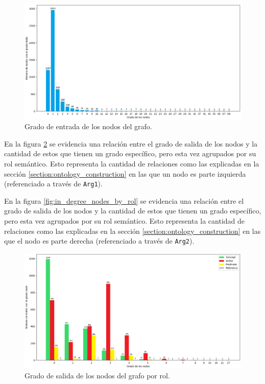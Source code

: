\vspace{-0.4in}
\begin{figure}[H]
	\begin{center}
		\includegraphics[width=\textwidth]{graphics/degree2.png}
		\caption[Grado de entrada de los nodos del grafo]{Grado de entrada de los nodos del grafo.}
		\label{fig:in_degree_all_nodes}
	\end{center}
\end{figure}

\vspace{-0.3in}
En la figura \ref{fig:out_degree_nodes_by_rol} se evidencia una relación entre el grado de salida de los nodos y la cantidad de estos que tienen un grado específico, pero esta vez agrupados por su rol semántico. Esto representa la cantidad de relaciones como las explicadas en la sección \ref{section:ontology_construction} en las que un nodo es parte izquierda (referenciado a través de \texttt{Arg1}).

En la figura \ref{fig:in_degree_nodes_by_rol} se evidencia una relación entre el grado de salida de los nodos y la cantidad de estos que tienen un grado específico, pero esta vez agrupados por su rol semántico. Esto representa la cantidad de relaciones como las explicadas en la sección \ref{section:ontology_construction} en las que el nodo es parte derecha (referenciado a través de \texttt{Arg2}).

\vspace{-0.15in}
\begin{figure}[H]
	\begin{center}
		\includegraphics[width=\textwidth]{graphics/degree3.png}
		\caption[Grado de salida de los nodos del grafo por rol]{Grado de salida de los nodos del grafo por rol.}
		\label{fig:out_degree_nodes_by_rol}
	\end{center}
\end{figure}

